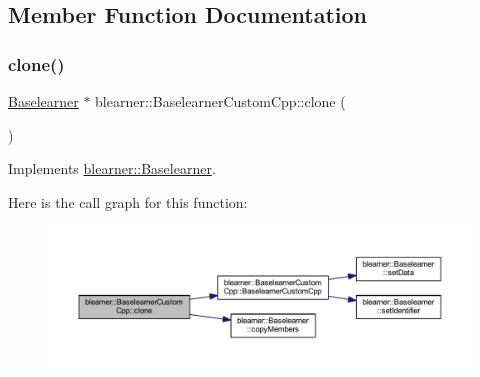 \subsection{Member Function Documentation}
\mbox{\label{classblearner_1_1_baselearner_custom_cpp_a8478407ac4d8ed118fd1381f65df150a}} 
\subsubsection{\texorpdfstring{clone()}{clone()}}
{\footnotesize\ttfamily \mbox{\hyperlink{classblearner_1_1_baselearner}{Baselearner}} $\ast$ blearner\+::\+Baselearner\+Custom\+Cpp\+::clone (\begin{DoxyParamCaption}{ }\end{DoxyParamCaption})\hspace{0.3cm}{\ttfamily [virtual]}}



Implements \mbox{\hyperlink{classblearner_1_1_baselearner_a8e12c6739f085917a7d2da6570c51a21}{blearner\+::\+Baselearner}}.

Here is the call graph for this function\+:\nopagebreak
\begin{figure}[H]
\begin{center}
\leavevmode
\includegraphics[width=350pt]{classblearner_1_1_baselearner_custom_cpp_a8478407ac4d8ed118fd1381f65df150a_cgraph}
\end{center}
\end{figure}
\mbox{\label{classblearner_1_1_baselearner_custom_cpp_ae130d3b469eff32c8e0be12d925cf88f}} 
